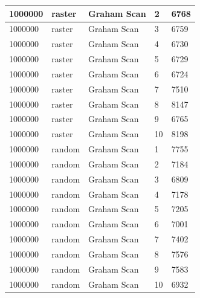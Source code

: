 \documentclass[12pt]{article}
\begin{document}
\begin{longtable}{|l|l|l|l|l|}
1000000      & raster            & Graham Scan & 2          & 6768                          \\ \hline
1000000      & raster            & Graham Scan & 3          & 6759                          \\ \hline
1000000      & raster            & Graham Scan & 4          & 6730                          \\ \hline
1000000      & raster            & Graham Scan & 5          & 6729                          \\ \hline
1000000      & raster            & Graham Scan & 6          & 6724                          \\ \hline
1000000      & raster            & Graham Scan & 7          & 7510                          \\ \hline
1000000      & raster            & Graham Scan & 8          & 8147                          \\ \hline
1000000      & raster            & Graham Scan & 9          & 6765                          \\ \hline
1000000      & raster            & Graham Scan & 10         & 8198                          \\ \hline
1000000      & random            & Graham Scan & 1          & 7755                          \\ \hline
1000000      & random            & Graham Scan & 2          & 7184                          \\ \hline
1000000      & random            & Graham Scan & 3          & 6809                          \\ \hline
1000000      & random            & Graham Scan & 4          & 7178                          \\ \hline
1000000      & random            & Graham Scan & 5          & 7205                          \\ \hline
1000000      & random            & Graham Scan & 6          & 7001                          \\ \hline
1000000      & random            & Graham Scan & 7          & 7402                          \\ \hline
1000000      & random            & Graham Scan & 8          & 7576                          \\ \hline
1000000      & random            & Graham Scan & 9          & 7583                          \\ \hline
1000000      & random            & Graham Scan & 10         & 6932                          \\ \hline

\end{longtable}
\end{document}
